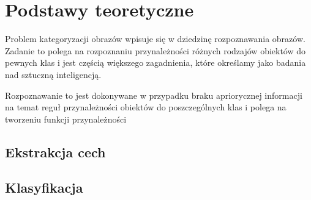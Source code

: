 \chapter{Podstawy teoretyczne}

Problem kategoryzacji obrazów wpisuje się w dziedzinę rozpoznawania obrazów. Zadanie to polega na rozpoznaniu przynależności różnych rodzajów obiektów do pewnych klas i jest częścią większego zagadnienia, które określamy jako badania nad sztuczną inteligencją.

Rozpoznawanie to jest dokonywane w przypadku braku apriorycznej informacji na temat reguł przynależności obiektów do poszczególnych klas i polega na tworzeniu funkcji przynależności 



\section{Ekstrakcja cech}

\section{Klasyfikacja}
